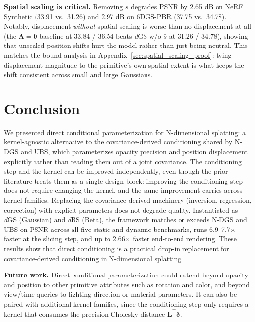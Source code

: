 \documentclass{article}
\newcommand{\dgs}{\textit{d}GS\xspace}
\newcommand{\dbs}{\textit{d}BS\xspace}
\theoremstyle{plain}
\theoremstyle{definition}
\theoremstyle{remark}
\begin{document}
\textbf{Spatial scaling is critical.} Removing $\bar{s}$ degrades PSNR by 2.65 dB on NeRF Synthetic (33.91 vs.\ 31.26) and 2.97 dB on 6DGS-PBR (37.75 vs.\ 34.78). Notably, displacement \emph{without} spatial scaling is worse than no displacement at all (the $\boldsymbol{\Lambda}{=}\mathbf{0}$ baseline at 33.84 / 36.54 beats \dgs{} w/o $\bar{s}$ at 31.26 / 34.78), showing that unscaled position shifts hurt the model rather than just being neutral. This matches the bound analysis in Appendix~\ref{sec:spatial_scaling_proof}: tying displacement magnitude to the primitive's own spatial extent is what keeps the shift consistent across small and large Gaussians.

\section{Conclusion}

We presented direct conditional parameterization for N-dimensional splatting: a kernel-agnostic alternative to the covariance-derived conditioning shared by N-DGS and UBS, which parameterizes opacity precision and position displacement explicitly rather than reading them out of a joint covariance. The conditioning step and the kernel can be improved independently, even though the prior literature treats them as a single design block: improving the conditioning step does not require changing the kernel, and the same improvement carries across kernel families. Replacing the covariance-derived machinery (inversion, regression, correction) with explicit parameters does not degrade quality. Instantiated as \dgs{} (Gaussian) and \dbs{} (Beta), the framework matches or exceeds N-DGS and UBS on PSNR across all five static and dynamic benchmarks, runs 6.9--7.7$\times$ faster at the slicing step, and up to 2.66$\times$ faster end-to-end rendering. These results show that direct conditioning is a practical drop-in replacement for covariance-derived conditioning in N-dimensional splatting.

\textbf{Future work.} Direct conditional parameterization could extend beyond opacity and position to other primitive attributes such as rotation and color, and beyond view/time queries to lighting direction or material parameters. It can also be paired with additional kernel families, since the conditioning step only requires a kernel that consumes the precision-Cholesky distance $\mathbf{L}^\top\boldsymbol{\delta}$.

\makeatletter
\if@neuripsfinal
\begin{ack}
\end{ack}
\fi
\makeatother
\end{document}
